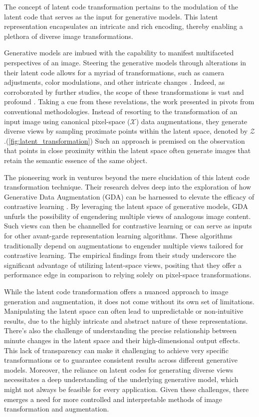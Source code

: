 \documentclass[preprint,12pt,authoryear]{elsarticle}
\begin{document}
The concept of latent code transformation pertains to the modulation of the latent code that serves as the input for generative models. This latent representation encapsulates an intricate and rich encoding, thereby enabling a plethora of diverse image transformations.

Generative models are imbued with the capability to manifest multifaceted perspectives of an image. Steering the generative models through alterations in their latent code allows for a myriad of transformations, such as camera adjustments, color modulations, and other intricate changes \cite{144_representation}. Indeed, as corroborated by further studies, the scope of these transformations is vast and profound \cite{145_representation,146_representation}. Taking a cue from these revelations, the work presented in \cite{143_representation} pivots from conventional methodologies. Instead of resorting to the transformation of an input image using canonical pixel-space ($\mathcal{X}$) data augmentations, they generate diverse views by sampling proximate points within the latent space, denoted by $\mathcal{Z}$.(\ref{fig:latent_transformation}) Such an approach is premised on the observation that points in close proximity within the latent space often generate images that retain the semantic essence of the same object. 

The pioneering work in \cite{143_representation} ventures beyond the mere elucidation of this latent code transformation technique. Their research delves deep into the exploration of how Generative Data Augmentation (GDA) can be harnessed to elevate the efficacy of contrastive learning \cite{148_representation,149_representation}. By leveraging the latent space of generative models, GDA unfurls the possibility of engendering multiple views of analogous image content. Such views can then be channelled for contrastive learning or can serve as inputs for other avant-garde representation learning algorithms. These algorithms traditionally depend on augmentations to engender multiple views tailored for contrastive learning. The empirical findings from their study underscore the significant advantage of utilizing latent-space views, positing that they offer a performance edge in comparison to relying solely on pixel-space transformations.

While the latent code transformation offers a nuanced approach to image generation and augmentation, it does not come without its own set of limitations. Manipulating the latent space can often lead to unpredictable or non-intuitive results, due to the highly intricate and abstract nature of these representations. There's also the challenge of understanding the precise relationship between minute changes in the latent space and their high-dimensional output effects. This lack of transparency can make it challenging to achieve very specific transformations or to guarantee consistent results across different generative models. Moreover, the reliance on latent codes for generating diverse views necessitates a deep understanding of the underlying generative model, which might not always be feasible for every application. Given these challenges, there emerges a need for more controlled and interpretable methods of image transformation and augmentation. 
\end{document}
